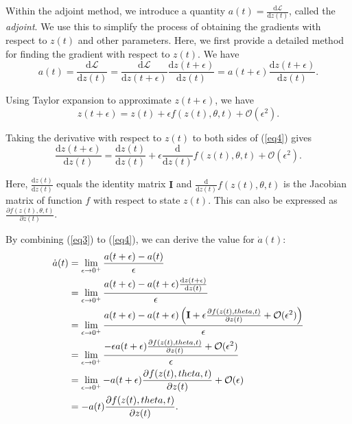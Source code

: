 \documentclass[a4paper,11pt,titlepage]{article}
\theoremstyle{definition}
\theoremstyle{plain}
\theoremstyle{remark}
\begin{document}
Within the adjoint method, we introduce a quantity $a(t) = \frac{\mathrm{d} \mathcal{L}}{\mathrm{d} z(t)}$, called the \textit{adjoint}. We use this to simplify the process of obtaining the gradients with respect to $z(t)$ and other parameters. Here, we first provide a detailed method for finding the gradient with respect to $z(t)$. We have
\begin{equation}\label{eq3}
    a(t) = \frac{\mathrm{d} \mathcal{L}}{\mathrm{d} z(t)} = \frac{\mathrm{d} \mathcal{L}}{\mathrm{d} z(t+\epsilon)}\frac{\mathrm{d} z(t+\epsilon)}{\mathrm{d} z(t)}=a(t+\epsilon)\frac{\mathrm{d} z(t+\epsilon)}{\mathrm{d} z(t)}. \tag{3}
\end{equation}

Using Taylor expansion to approximate $z(t+\epsilon)$, we have
\begin{equation}\label{eq4}
z(t+\epsilon) = z(t)+\epsilon f(z(t),\theta,t) +\mathcal{O}(\epsilon^2). \tag{4}
\end{equation}

Taking the derivative with respect to $z(t)$ to both sides of (\ref{eq4}) gives
$$
\frac{\mathrm{d}z(t+\epsilon)}{\mathrm{d}z(t)} = \frac{\mathrm{d}z(t)}{\mathrm{d}z(t)}+\epsilon\frac{\mathrm{d}}{\mathrm{d}z(t)}f(z(t),\theta,t)+\mathcal{O}(\epsilon^2).
$$

Here, $\frac{\mathrm{d}z(t)}{\mathrm{d}z(t)}$ equals the identity matrix $\mathbf{I}$ and $\frac{\mathrm{d}}{\mathrm{d}z(t)}f(z(t),\theta,t)$ is the Jacobian matrix of function $f$ with respect to state $z(t)$. This can also be expressed as $\frac{\partial f(z(t),\theta,t)}{\partial z(t)}$.

By combining (\ref{eq3}) to (\ref{eq4}), we can derive the value for $\dot{a}(t)$:
\begin{align}
\dot{a}(t) &= \lim_{\epsilon \to 0^{+}}\frac{a(t+\epsilon)-a(t)}{\epsilon}\notag\\
&=\lim_{\epsilon \to 0^{+}}\frac{a(t+\epsilon)-a(t+\epsilon)\frac{\mathrm{d} z(t+\epsilon)}{\mathrm{d}z(t)}}{\epsilon}\notag\\
&=\lim_{\epsilon \to 0^{+}}\frac{a(t+\epsilon)-a(t+\epsilon)\left(\mathbf{I}+\epsilon\frac{\partial f(z(t),\theta,t)}{\partial z(t)}+\mathcal{O}(\epsilon^2)\right)}{\epsilon}\notag\\
&=\lim_{\epsilon \to 0^{+}}\frac{-\epsilon a(t+\epsilon)\frac{\partial f(z(t),\theta,t)}{\partial z(t)}+\mathcal{O}(\epsilon^2)}{\epsilon}\notag
\\
&=\lim_{\epsilon \to 0^{+}}-a(t+\epsilon)\frac{\partial f(z(t),\theta,t)}{\partial z(t)}+\mathcal{O}(\epsilon)\notag\\
&=-a(t)\frac{\partial f(z(t),\theta,t)}{\partial z(t)}.\notag
\end{align}
\end{document}
